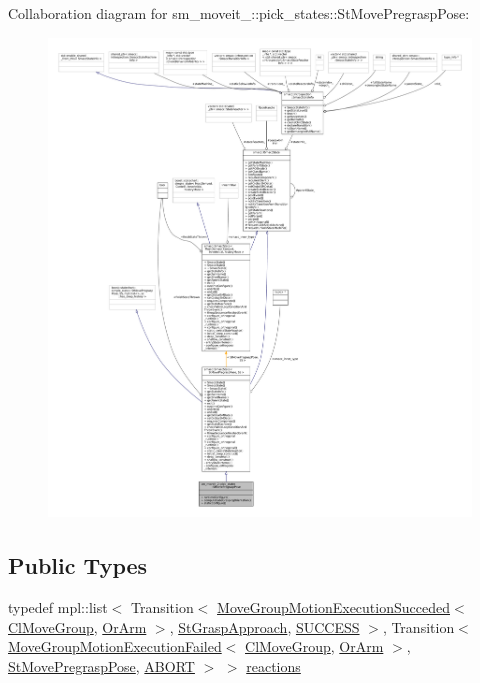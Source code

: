 Collaboration diagram for sm\+\_\+moveit\+\_\+:\+:pick\+\_\+states\+:\+:St\+Move\+Pregrasp\+Pose\+:
\nopagebreak
\begin{figure}[H]
\begin{center}
\leavevmode
\includegraphics[width=350pt]{structsm__moveit__2_1_1pick__states_1_1StMovePregraspPose__coll__graph}
\end{center}
\end{figure}
\subsection*{Public Types}
\begin{DoxyCompactItemize}
\item 
typedef mpl\+::list$<$ Transition$<$ \hyperlink{structmove__group__interface__client_1_1MoveGroupMotionExecutionSucceded}{Move\+Group\+Motion\+Execution\+Succeded}$<$ \hyperlink{classmove__group__interface__client_1_1ClMoveGroup}{Cl\+Move\+Group}, \hyperlink{classsm__moveit__2_1_1OrArm}{Or\+Arm} $>$, \hyperlink{structsm__moveit__2_1_1pick__states_1_1StGraspApproach}{St\+Grasp\+Approach}, \hyperlink{classSUCCESS}{S\+U\+C\+C\+E\+SS} $>$, Transition$<$ \hyperlink{structmove__group__interface__client_1_1MoveGroupMotionExecutionFailed}{Move\+Group\+Motion\+Execution\+Failed}$<$ \hyperlink{classmove__group__interface__client_1_1ClMoveGroup}{Cl\+Move\+Group}, \hyperlink{classsm__moveit__2_1_1OrArm}{Or\+Arm} $>$, \hyperlink{structsm__moveit__2_1_1pick__states_1_1StMovePregraspPose}{St\+Move\+Pregrasp\+Pose}, \hyperlink{classABORT}{A\+B\+O\+RT} $>$ $>$ \hyperlink{structsm__moveit__2_1_1pick__states_1_1StMovePregraspPose_a4d0d6e4b695e0c9e14e251d6281d35ed}{reactions}
\end{DoxyCompactItemize}
